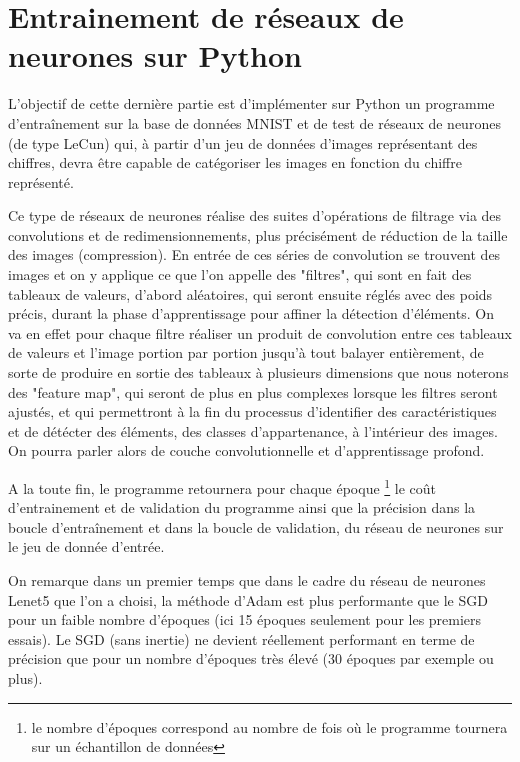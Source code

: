 \documentclass{article}
\begin{document}
\section{Entrainement de réseaux de neurones sur Python}

L'objectif de cette dernière partie est d'implémenter sur Python un programme d'entraînement sur la base de données MNIST et de test de réseaux de neurones (de type LeCun) qui, à partir d'un jeu de données d'images représentant des chiffres, devra être capable de catégoriser les images en fonction du chiffre représenté.

\bigskip

Ce type de réseaux de neurones réalise des suites d'opérations de filtrage via des convolutions et de redimensionnements, plus précisément de réduction de la taille des images (compression). En entrée de ces séries de convolution se trouvent des images et on y applique ce que l'on appelle des "filtres", qui sont en fait des tableaux de valeurs, d'abord aléatoires, qui seront ensuite réglés avec des poids précis, durant la phase d'apprentissage pour affiner la détection d'éléments. On va en effet pour chaque filtre réaliser un produit de convolution entre ces tableaux de valeurs et l'image portion par portion jusqu'à tout balayer entièrement, de sorte de produire en sortie des tableaux à plusieurs dimensions que nous noterons des "feature map", qui seront de plus en plus complexes lorsque les filtres seront ajustés, et qui permettront à la fin du processus d'identifier des caractéristiques et de détécter des éléments, des classes d'appartenance, à l'intérieur des images. On pourra parler alors de couche convolutionnelle et d'apprentissage profond.

\bigskip

A la toute fin, le programme retournera pour chaque époque \footnote{le nombre d'époques correspond au nombre de fois où le programme tournera sur un échantillon de données} le coût d'entrainement et de validation du programme ainsi que la précision dans la boucle d'entraînement et dans la boucle de validation, du réseau de neurones sur le jeu de donnée d'entrée.

\bigskip

On remarque dans un premier temps que dans le cadre du réseau de neurones Lenet5 que l'on a choisi, la méthode d'Adam est plus performante que le SGD pour un faible nombre d'époques (ici 15 époques seulement pour les premiers essais). Le SGD (sans inertie) ne devient réellement performant en terme de précision que pour un nombre d'époques très élevé (30 époques par exemple ou plus).
\end{document}
